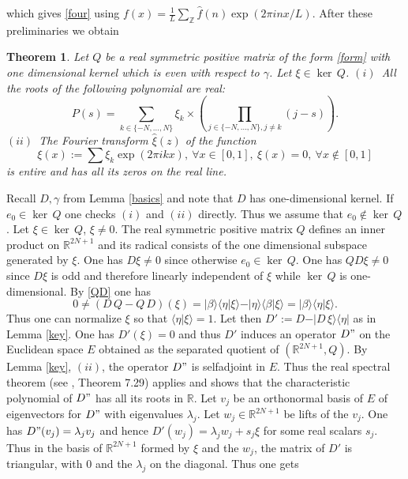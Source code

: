 \documentclass{amsart}
\newtheorem{thm}{Theorem}[section]
\def\R{{\mathbb R}}
\def\Z{{\mathbb Z}}
\def\R{{\mathbb R}}
\def\Z{{\mathbb Z}}
\begin{document}
which gives \eqref{four} using $f(x)=\frac 1L\sum_\Z \widehat{ f}(n)\exp(2\pi inx/L)$. \endproof 
After these preliminaries we obtain
 \begin{thm}\label{finmain} Let $Q$ be a real symmetric positive  matrix  of the form \eqref{form} with one dimensional kernel which is even with respect to $\gamma$. Let $\xi\in \ker\, Q$.\newline
 $(i)$~All the roots of the following polynomial are real:
\begin{equation}\label{thmpoly}
 P(s)=\sum_{k\in\{-N,\ldots,N\}}\xi_k\times \left(\prod_{j\in\{-N,\ldots,N\}, j\neq k}(j-s)\right).
\end{equation} 	
$(ii)$~The Fourier transform $\widehat\xi(z)$ of the function 
  $$
\xi(x):=\sum \xi_k\exp(2\pi ikx), \ \forall x\in [0,1], \ \xi(x)=0, \ \forall x\notin [0,1] 
$$
is entire and has all its zeros on the real line.
 \end{thm}
Recall $D, \gamma$ from Lemma \ref{basics} and note that $D$ has one-dimensional kernel. If  $e_0\in \ker\, Q$ one checks $(i)$ and $(ii)$ directly. Thus we assume that $e_0\notin \ker\, Q$. Let $\xi\in \ker\, Q$, $\xi\neq 0$. The real symmetric positive  matrix $Q$ defines an inner product on $\R^{2N+1}$ and its radical consists of the one dimensional subspace generated by $\xi$. One has $D\xi\neq 0$ since otherwise $e_0\in \ker\, Q$.  One has $QD\xi\neq 0$ since $D\xi$ is odd and therefore linearly independent of $\xi$ while $\ker\, Q$ is one-dimensional. By \eqref{QD} one has
 $$
 0\neq (D\,	Q-Q\, D)(\xi)=\vert \beta\rangle\langle \eta\vert\xi\rangle -\vert \eta\rangle\langle \beta\vert\xi\rangle=\vert \beta\rangle\langle \eta\vert\xi\rangle.
 $$ 
 Thus one can normalize $\xi$ so that $\langle \eta\vert\xi\rangle=1$. Let then $D':=D-\vert D\,\xi\rangle\langle \eta\vert$ as in Lemma \ref{key}. One has $D'(\xi)=0$ and thus $D'$ induces an operator $D"$ on the Euclidean space $E$ obtained as the separated quotient of $(\R^{2N+1},Q)$. By Lemma \ref{key}, $(ii)$, the operator $D"$ is selfadjoint in $E$. Thus the real spectral theorem (see \cite{AS}, Theorem 7.29) applies and shows that the characteristic polynomial of $D"$ has all its roots in $\R$. Let $v_j$ be an orthonormal basis of $E$ of eigenvectors for  $D"$ with eigenvalues $\lambda_j$. Let $w_j\in \R^{2N+1}$ be lifts of the $v_j$. One has $D"(v_j)=\lambda_jv_j$ and hence $D'(w_j)=\lambda_jw_j+s_j \xi$ for some real scalars $s_j$. Thus in the basis of $\R^{2N+1}$ formed by $\xi$ and the $w_j$, the matrix of $D'$ is triangular, with $0$ and the $\lambda_j$ on the diagonal. Thus  one gets 
\end{document}
